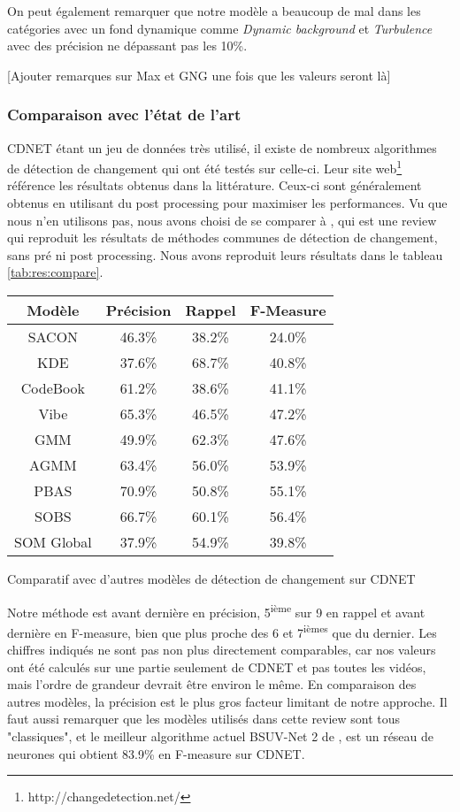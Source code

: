 	On peut également remarquer que notre modèle a beaucoup de mal dans les catégories avec un fond dynamique comme \textit{Dynamic background} et \textit{Turbulence} avec des précision ne dépassant pas les 10\%.

	[Ajouter remarques sur Max et GNG une fois que les valeurs seront là]

	\subsubsection{Comparaison avec l'état de l'art}

	CDNET étant un jeu de données très utilisé, il existe de nombreux algorithmes de détection de changement qui ont été testés sur celle-ci. Leur site web\footnote{http://changedetection.net/} référence les résultats obtenus dans la littérature. Ceux-ci sont généralement obtenus en utilisant du post processing pour maximiser les performances. Vu que nous n'en utilisons pas, nous avons choisi de se comparer à \cite{xu2016background}, qui est une review qui reproduit les résultats de méthodes communes de détection de changement, sans pré ni post processing. Nous avons reproduit leurs résultats dans le tableau \ref{tab:res:compare}.

	\begin{tableth}
    \begin{tabular}{|c|ccc|}
		\hline
		Modèle & Précision & Rappel & F-Measure\\
		\hline
		SACON & 46.3\% & 38.2\% & 24.0\%\\
		KDE & 37.6\% & 68.7\% & 40.8\%\\
		CodeBook & 61.2\% & 38.6\% & 41.1\% \\
		Vibe & 65.3\% & 46.5\% & 47.2\% \\
		GMM & 49.9\% & 62.3\% & 47.6\% \\
		AGMM & 63.4\% & 56.0\% & 53.9\% \\
		PBAS & 70.9\% & 50.8\% & 55.1\% \\
		SOBS & 66.7\% & 60.1\% & 56.4\% \\
		\hline
		SOM Global & 37.9\% & 54.9\% & 39.8\% \\
		\hline
	\end{tabular}
	\caption{Comparatif avec d'autres modèles de détection de changement sur CDNET}
	\label{tab:res:compare}
	\end{tableth}

	Notre méthode est avant dernière en précision, 5\textsuperscript{ième} sur 9 en rappel et avant dernière en F-measure, bien que plus proche des 6 et 7\textsuperscript{ièmes} que du dernier. Les chiffres indiqués ne sont pas non plus directement comparables, car nos valeurs ont été calculés sur une partie seulement de CDNET et pas toutes les vidéos, mais l'ordre de grandeur devrait être environ le même. En comparaison des autres modèles, la précision est le plus gros facteur limitant de notre approche. Il faut aussi remarquer que les modèles utilisés dans cette review sont tous "classiques", et le meilleur algorithme actuel BSUV-Net 2 de \cite{tezcan2021bsuv}, est un réseau de neurones qui obtient 83.9\% en F-measure sur CDNET.

